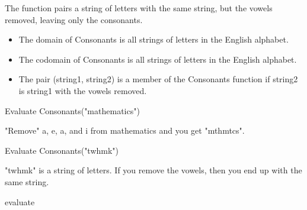 \documentclass{ximera}
\begin{document}
\begin{definition}
  The function  pairs a string of letters with the same string, but the vowels removed, leaving only the consonants.
 
    \begin{itemize}
    \item The domain of Consonants is all strings of letters in the English alphabet.
    \item The codomain of Consonants is all strings of letters in the English alphabet.
    \item The pair (string1, string2) is a member of the Consonants function if string2 is string1 with the vowels removed.
    \end{itemize}

  
\end{definition}



\begin{exercise}

 Evaluate Consonants("mathematics")

  \begin{multipleChoice}
  \end{multipleChoice}
  \begin{feedback}
"Remove" a, e, a, and i from mathematics and you get "mthmtcs".
  \end{feedback}
\end{exercise}



\begin{exercise}

 Evaluate Consonants("twhmk")

  \begin{multipleChoice}
  \end{multipleChoice}
  \begin{feedback}
"twhmk" is a string of letters. If you remove the vowels, then you end up with the same string.
  \end{feedback}
\end{exercise}


\begin{exercise}
evaluate 
\end{exercise}
\end{document}
